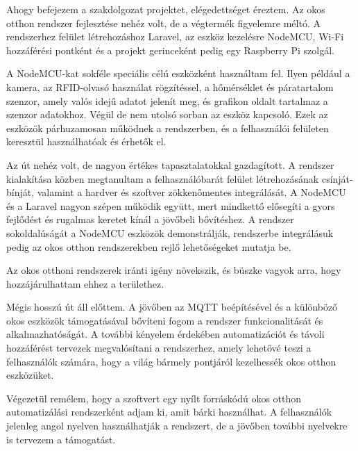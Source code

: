 \documentclass[
]{thesis-ekf}
\theoremstyle{definition}
\theoremstyle{remark}
\begin{document}
	Ahogy befejezem a szakdolgozat projektet, elégedettséget éreztem. Az okos otthon rendszer fejlesztése nehéz volt, de a végtermék figyelemre méltó. A rendszerhez felület létrehozáshoz Laravel, az eszköz kezelésre NodeMCU, Wi-Fi hozzáférési pontként és a projekt gerinceként pedig egy Raspberry Pi szolgál.
	
	A NodeMCU-kat sokféle speciális célú eszközként használtam fel. Ilyen például a kamera, az RFID-olvasó használat rögzítéssel, a hőmérséklet és páratartalom szenzor, amely valós idejű adatot jelenít meg, és grafikon oldalt tartalmaz a szenzor adatokhoz.  Végül de nem utolsó sorban az eszköz kapcsoló. Ezek az eszközök párhuzamosan működnek a rendszerben, és a felhasználói felületen keresztül használhatóak és érhetők el.
	
	Az út nehéz volt, de nagyon értékes tapasztalatokkal gazdagított. A rendszer kialakítása közben megtanultam a felhasználóbarát felület létrehozásának csínját-bínját, valamint a hardver és szoftver zökkenőmentes integrálását. A NodeMCU és a Laravel nagyon szépen működik együtt, mert mindkettő elősegíti a gyors fejlődést és rugalmas keretet kínál a jövőbeli bővítéshez. A rendszer sokoldalúságát a NodeMCU eszközök demonstrálják, rendszerbe integrálásuk pedig az okos otthon rendszerekben rejlő lehetőségeket mutatja be.
	
	Az okos otthoni rendszerek iránti igény növekszik, és büszke vagyok arra, hogy hozzájárulhattam ehhez a területhez.
	
	Mégis hosszú út áll előttem. A jövőben az MQTT beépítésével és a különböző okos eszközök támogatásával bővíteni fogom a rendszer funkcionalitását és alkalmazhatóságát. A további kényelem érdekében automatizációt és távoli hozzáférést tervezek megvalósítani a rendszerhez, amely lehetővé teszi a felhasználók számára, hogy a világ bármely pontjáról kezelhessék okos otthon eszközüket.
	
	Végezetül remélem, hogy a szoftvert egy nyílt forráskódú okos otthon automatizálási rendszerként adjam ki, amit bárki használhat. A felhasználók jelenleg angol nyelven használhatják a rendszert, de a jövőben további nyelvekre is tervezem a támogatást.
	
	
	
\end{document}
